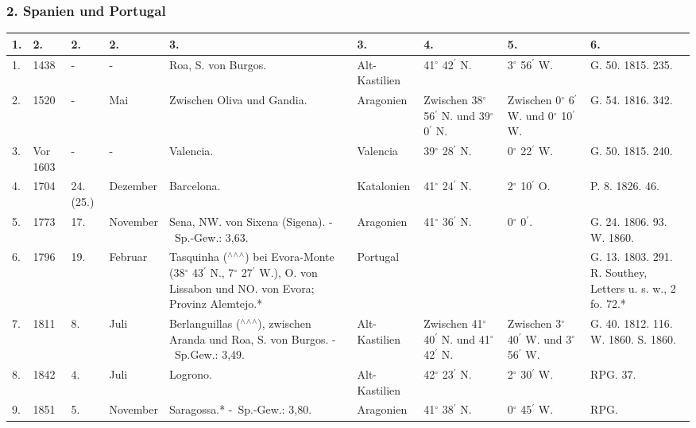 \documentclass[a4paper, 8pt, oneside, polutonikogreek, german]{article}
\begin{document}
\subsubsection{2. Spanien und Portugal}
\begin{table}[!h]
    \centering
    \footnotesize
    \begin{tabular}{|p{3mm}|p{5mm}|p{5mm}|p{11mm}|p{25mm}|p{17mm}|p{11mm}|p{11mm}|p{11mm}|}
    \hline
        1. & 2. & 2. & 2. & 3. & 3. & 4. & 5. & 6. \\ \hline
        1. & 1438 & - & - & Roa, S. von Burgos. & Alt-Kastilien & 41$^\circ$ 42$^\prime$ N. & 3$^\circ$ 56$^\prime$ W. & G. 50. 1815. 235. \\ \hline
        2. & 1520 & - & Mai & Zwischen Oliva und Gandia. & Aragonien & Zwischen 38$^\circ$ 56$^\prime$ N. und 39$^\circ$ 0$^\prime$ N. & Zwischen 0$^\circ$ 6$^\prime$ W. und 0$^\circ$ 10$^\prime$ W. & G. 54. 1816. 342. \\ \hline
        3. & Vor 1603 & - & - & Valencia. & Valencia & 39$^\circ$ 28$^\prime$ N. & 0$^\circ$ 22$^\prime$ W. & G. 50. 1815. 240. \\ \hline
        4. & 1704 & 24. (25.) & Dezember & Barcelona. & Katalonien & 41$^\circ$ 24$^\prime$ N. & 2$^\circ$ 10$^\prime$ O. & P. 8. 1826. 46. \\ \hline
        5. & 1773 & 17. & November & Sena, NW. von Sixena (Sigena). - Sp.-Gew.: 3,63. & Aragonien & 41$^\circ$ 36$^\prime$ N. & 0$^\circ$ 0$^\prime$. & G. 24. 1806. 93. W. 1860. \\ \hline
        6. & 1796 & 19. & Februar & Tasquinha ($^\wedge$$^\wedge$$^\wedge$) bei Evora-Monte (38$^\circ$ 43$^\prime$ N., 7$^\circ$ 27$^\prime$ W.), O. von Lissabon und NO. von Evora; Provinz Alemtejo.* & Portugal & ~ & ~ & G. 13. 1803. 291. R. Southey, Letters u. s. w., 2 fo. 72.* \\ \hline
        7. & 1811 & 8. & Juli & Berlanguillas ($^\wedge$$^\wedge$$^\wedge$), zwischen Aranda und Roa, S. von Burgos. - Sp.Gew.: 3,49. & Alt-Kastilien & Zwischen 41$^\circ$ 40$^\prime$ N. und 41$^\circ$ 42$^\prime$ N. & Zwischen 3$^\circ$ 40$^\prime$ W. und 3$^\circ$ 56$^\prime$ W. & G. 40. 1812. 116. W. 1860. S. 1860. \\ \hline
        8. & 1842 & 4. & Juli & Logrono. & Alt-Kastilien & 42$^\circ$ 23$^\prime$ N. & 2$^\circ$ 30$^\prime$ W. & RPG. 37. \\ \hline
        9. & 1851 & 5. & November & Saragossa.* - Sp.-Gew.: 3,80. & Aragonien & 41$^\circ$ 38$^\prime$ N. & 0$^\circ$ 45$^\prime$ W. & RPG. \\ \hline
    \end{tabular}
\end{table}
\end{document}
